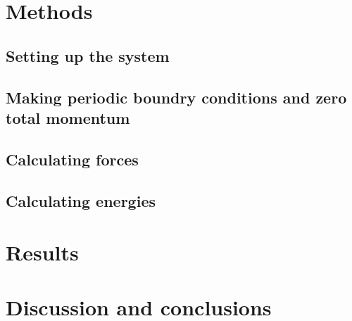 \documentclass[10pt]{article}
\begin{document}
\begin{multicols}{2}
\section{Methods}
\subsection{Setting up the system}
\subsection{Making periodic boundry conditions and zero total momentum}
\subsection{Calculating forces}
\subsection{Calculating energies}



\section{Results}


\section{Discussion and conclusions}





{}


\end{multicols}
\end{document}
